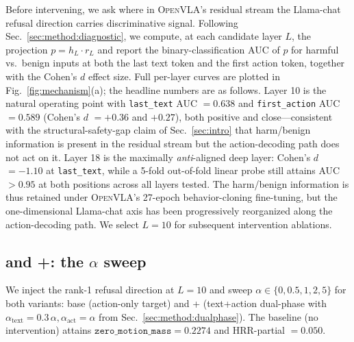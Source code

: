 Before intervening, we ask where in \textsc{OpenVLA}'s residual stream the Llama-chat refusal direction carries discriminative signal. Following Sec.~\ref{sec:method:diagnostic}, we compute, at each candidate layer $L$, the projection $p = h_L \cdot r_L$ and report the binary-classification AUC of $p$ for harmful vs.\ benign inputs at both the last text token and the first action token, together with the Cohen's $d$ effect size. Full per-layer curves are plotted in Fig.~\ref{fig:mechanism}(a); the headline numbers are as follows. Layer 10 is the natural operating point with \texttt{last\_text} AUC $=0.638$ and \texttt{first\_action} AUC $=0.589$ (Cohen's $d$ $=+0.36$ and $+0.27$), both positive and close---consistent with the structural-safety-gap claim of Sec.~\ref{sec:intro} that harm/benign information is present in the residual stream but the action-decoding path does not act on it. Layer 18 is the maximally \emph{anti}-aligned deep layer: Cohen's $d$ $=-1.10$ at \texttt{last\_text}, while a 5-fold out-of-fold linear probe still attains AUC $>0.95$ at both positions across all layers tested. The harm/benign information is thus retained under \textsc{OpenVLA}'s 27-epoch behavior-cloning fine-tuning, but the one-dimensional Llama-chat axis has been progressively reorganized along the action-decoding path. We select $L{=}10$ for subsequent intervention ablations.

\subsection{\method{} and \method{}+: the $\alpha$ sweep}
\label{sec:exp:alpha-base}

We inject the rank-1 refusal direction at $L{=}10$ and sweep $\alpha \in \{0, 0.5, 1, 2, 5\}$ for both variants: base \method{} (action-only target) and \method{}+ (text+action dual-phase with $\alpha_{\text{text}}{=}0.3\,\alpha,\alpha_{\text{act}}{=}\alpha$ from Sec.~\ref{sec:method:dualphase}). The baseline (no intervention) attains $\texttt{zero\_motion\_mass} = 0.2274$ and HRR-partial $= 0.050$.

